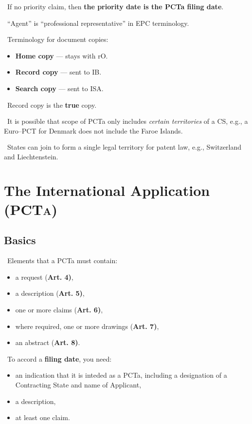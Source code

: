 \documentclass{report}
\newcommand{\n}{\newline}
\newcommand{\p}{\adforn{61} \ }
\begin{document}
\p If no priority claim, then \textbf{the priority date is the PCTa filing date}. \n

\p ``Agent'' is ``professional representative'' in EPC terminology. \n

\p Terminology for document copies:

\begin{itemize}
\centering
 \item \textbf{Home copy} --- stays with rO.
 \item \textbf{Record copy} --- sent to IB.
 \item \textbf{Search copy} --- sent to ISA.
\end{itemize}

\p Record copy is the \textbf{true} copy. \n

\p It is possible that scope of PCTa only includes \textit{certain territories} of a CS, e.g., a Euro--PCT for Denmark does not include the Faroe Islands. \n

\p States can join to form a single legal territory for patent law, e.g., Switzerland and Liechtenstein. \n

\newpage

\chapter{The International Application (\textsc{PCTa})}

\section{Basics}

\p Elements that a PCTa must contain:

\begin{itemize}
 \item a request (\textbf{Art. 4)},
 \item a description (\textbf{Art. 5)},
 \item one or more claims (\textbf{Art. 6)},
 \item where required, one or more drawings (\textbf{Art. 7)},
 \item an abstract (\textbf{Art. 8)}.
\end{itemize}

\p To accord a \textbf{filing date}, you need:

\begin{itemize}
 \item an indication that it is inteded as a PCTa, including a designation of a Contracting State and name of Applicant,
 \item a description,
 \item at least one claim.
\end{itemize}
\end{document}
